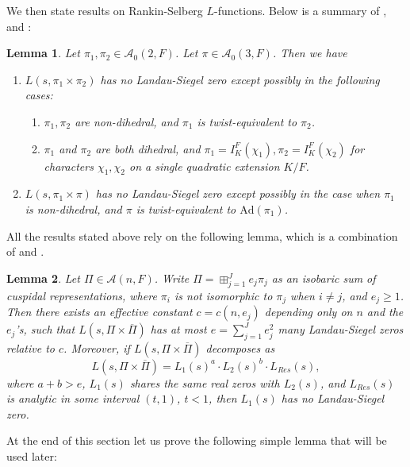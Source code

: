 \documentclass[12pt]{amsart}
\newcommand{\Ad}{\text{Ad}}
\newcommand{\cA}{\mathcal{A}}
\newcommand{\ov}{\overline}
\newtheorem{lemma}{Lemma}[section]
\begin{document}
We then state results on Rankin-Selberg $L$-functions. Below is a summary of \cite[Theorem A]{RamakrishnanWang2003},\cite[Theorem 1]{Luo2023} and \cite[Theorem 2]{Luo2023}:

\begin{lemma}\label{Rankin Selberg Landau-Siegel zero}
    Let $\pi_1,\pi_2 \in \cA_0(2,F)$. Let $\pi \in \cA_0(3,F)$. Then we have 
    \begin{enumerate}
        \item $L(s,\pi_1 \times \pi_2)$ has no Landau-Siegel zero except possibly in the following cases:
        \begin{enumerate}
            \item $\pi_1,\pi_2$ are non-dihedral, and $\pi_1$ is twist-equivalent to $\pi_2$.
            \item $\pi_1$ and $\pi_2$ are both dihedral, and $\pi_1 = I_K^F(\chi_1), \pi_2 = I_K^F(\chi_2)$ for characters $\chi_1,\chi_2$ on a single quadratic extension $K/F$.
        \end{enumerate}
        \item $L(s,\pi_1 \times \pi)$ has no Landau-Siegel zero except possibly in the case when $\pi_1$ is non-dihedral, and $\pi$ is twist-equivalent to $\Ad(\pi_1)$.
    \end{enumerate}
\end{lemma}

All the results stated above rely on the following lemma, which is a combination of \cite[Lemma a]{HoffsteinRamakrishnan1995} and \cite[Appendix, Lemma]{HoffsteinLockhart1994}.

\begin{lemma}\label{Landau-Siegel zero lemma}
    Let $\Pi \in \cA(n,F)$. Write $\Pi = \boxplus_{j=1}^J e_j\pi_j$ as an isobaric sum of cuspidal representations, where $\pi_i$ is not isomorphic to $\pi_j$ when $i \neq j$, and $e_j \geq 1$. Then there exists an effective constant $c = c(n,e_j)$ depending only on $n$ and the $e_j$'s, such that $L(s,\Pi \times \ov{\Pi})$ has at most $e = \sum_{j=1}^J e_j^2$ many Landau-Siegel zeros relative to $c$. Moreover, if $L(s,\Pi \times \ov{\Pi})$ decomposes as 
    $$L(s,\Pi \times \ov{\Pi}) = L_1(s)^a \cdot L_2(s)^b \cdot L_{Res}(s),$$
    where $a+b > e$, $L_1(s)$ shares the same real zeros with $L_2(s)$, and $L_{Res}(s)$ is analytic in some interval $(t,1)$, $t<1$, then $L_1(s)$ has no Landau-Siegel zero.
\end{lemma}

At the end of this section let us prove the following simple lemma that will be used later:
\end{document}
